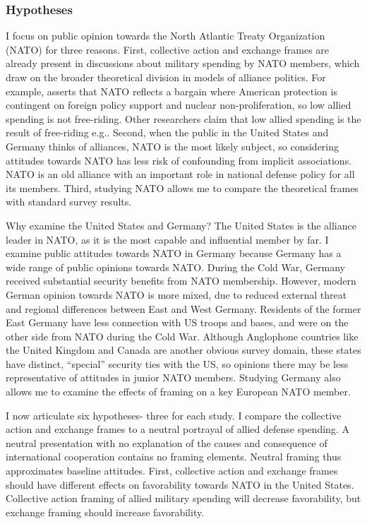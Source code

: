 \documentclass[12pt]{article}
\begin{document}
\subsubsection{Hypotheses}


I focus on public opinion towards the North Atlantic Treaty Organization (NATO) for three reasons. 
First, collective action and exchange frames are already present in discussions about military spending by NATO members, which draw on the broader theoretical division in models of alliance politics.
For example, \citet{Lanoszka2015} asserts that NATO reflects a bargain where American protection is contingent on foreign policy support and nuclear non-proliferation, so low allied spending is not free-riding. 
Other researchers claim that low allied spending is the result of free-riding e.g.\citep{OlsonZeckhauser1966, PluemperNeumayer2015, KimSandler2019}.
Second, when the public in the United States and Germany thinks of alliances, NATO is the most likely subject, so considering attitudes towards NATO has less risk of confounding from implicit associations. 
NATO is an old alliance with an important role in national defense policy for all its members. 
Third, studying NATO allows me to compare the theoretical frames with standard survey results.


Why examine the United States and Germany? 
The United States is the alliance leader in NATO, as it is the most capable and influential member by far. 
I examine public attitudes towards NATO in Germany because Germany has a wide range of public opinions towards NATO. 
During the Cold War, Germany received substantial security benefits from NATO membership. 
However, modern German opinion towards NATO is more mixed, due to reduced external threat and regional differences between East and West Germany.
Residents of the former East Germany have less connection with US troops and bases, and were on the other side from NATO during the Cold War. 
Although Anglophone countries like the United Kingdom and Canada are another obvious survey domain, these states have distinct, ``special'' security ties with the US, so opinions there may be less representative of attitudes in junior NATO members. 
Studying Germany also allows me to examine the effects of framing on a key European NATO member. 


I now articulate six hypotheses- three for each study. 
I compare the collective action and exchange frames to a neutral portrayal of allied defense spending. 
A neutral presentation with no explanation of the causes and consequence of international cooperation contains no framing elements. 
Neutral framing thus approximates baseline attitudes. 
First, collective action and exchange frames should have different effects on favorability towards NATO in the United States. 
Collective action framing of allied military spending will decrease favorability, but exchange framing should increase favorability. 
\end{document}
